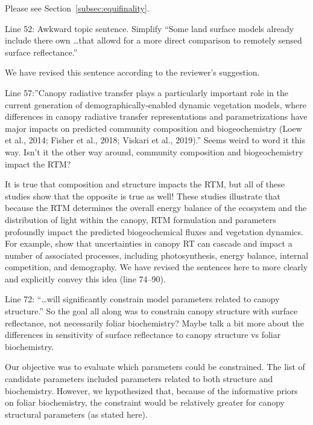 Please see Section~\ref{subsec:equifinality}.

\begin{reviewer}
  Line 52: Awkward topic sentence. Simplify “Some land surface models already include there own \ldots that allowd for a more direct comparison to remotely sensed surface reflectance.”
\end{reviewer}

We have revised this sentence according to the reviewer’s suggestion.

\begin{reviewer}
Line 57:”Canopy radiative transfer plays a particularly important role in the current generation of demographically-enabled dynamic vegetation models, where differences in canopy radiative transfer representations and parametrizations have major impacts on predicted community composition and biogeochemistry (Loew et al., 2014; Fisher et al., 2018; Viskari et al., 2019).” Seems weird to word it this way. Isn’t it the other way around, community composition and biogeochemistry impact the RTM?
\end{reviewer}

It is true that composition and structure impacts the RTM, but all of these studies show that the opposite is true as well!
These studies illustrate  that because the RTM determines the overall energy balance of the ecosystem and the distribution of light within the canopy, RTM formulation and parameters profoundly impact the predicted biogeochemical fluxes and vegetation dynamics.
For example, \citet{viskari_2019_influence} show that uncertainties in canopy RT can cascade and impact a number of associated processes, including photosynthesis, energy balance, internal competition, and demography.
We have revised the sentences here to more clearly and explicitly convey this idea (line 74--90).

\begin{reviewer}
  Line 72: “\ldots will significantly constrain model parameters related to canopy structure.” So the goal all along was to constrain canopy structure with surface reflectance, not necessarily foliar biochemistry? Maybe talk a bit more about the differences in sensitivity of surface reflectance to canopy structure vs foliar biochemistry.
\end{reviewer}

Our objective was to evaluate which parameters could be constrained.
The list of candidate parameters included parameters related to both structure and biochemistry.
However, we hypothesized that, because of the informative priors on foliar biochemistry, the constraint would be relatively greater for canopy structural parameters (as stated here).

